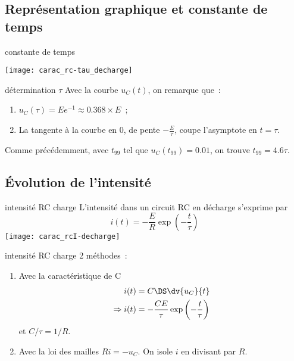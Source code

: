 \documentclass[../main/main.tex]{subfiles}
\begin{document}
\subsection{Représentation graphique et constante de temps}
\begin{tcbraster}[raster columns=2, raster equal height=rows]
    \begin{impl}[label=impl:tauRC]{constante de temps}
        \begin{center}
            \texttt{[image: carac\_rc-tau\_decharge]}
        \end{center}
    \end{impl}
    \begin{exem}[label=impl:déterm]{détermination $\tau$}
        Avec la courbe $u_C(t)$, on remarque que~:
        \begin{enumerate}
            \item $u_C(\tau) = E e^{-1} \approx \num{0.368}\times E$~;
            \item La tangente à la courbe en 0, de pente $- \frac{E}{\tau}$,
                coupe l'asymptote en $t = \tau$.
        \end{enumerate}
        Comme précédemment, avec $t_{99}$ tel que $u_C(t_{99}) = \num{0.01}$, on
        trouve $t_{99} = \num{4.6}\tau$.
    \end{exem}
\end{tcbraster}

\subsection{Évolution de l'intensité}

\begin{tcbraster}[raster columns=2, raster equal height=rows]
    \begin{prop}[label=prop:irc-charge, sidebyside,
        righthand width=.15\linewidth]{intensité RC charge}
        L'intensité dans un circuit RC en décharge s'exprime par
        \[\boxed{i(t) = -\frac{E}{R}\exp \left(-\frac{t}{\tau} \right)}\]
        \tcblower
        \hspace*{-12pt}\texttt{[image: carac\_rcI-decharge]}
    \end{prop}
    \begin{demo}[label=demo:irc-charge]{intensité RC charge}
        2 méthodes~:
        \begin{enumerate}
            \item Avec la caractéristique de C
                \begin{align*}
                                i(t) &= C\DS \dv{u_C}{t}\\
                    \Rightarrow i(t) &= - \frac{CE}{\tau} \exp \left(-
                    \frac{t}{\tau} \right)
                \end{align*}
                et $C/\tau = 1/R$.
            \item Avec la loi des mailles $Ri = -u_C$. On isole $i$ en
                divisant par $R$.
        \end{enumerate}
    \end{demo}
\end{tcbraster}
\end{document}
